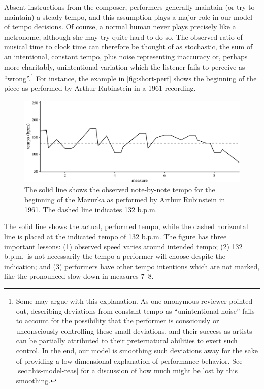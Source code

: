 \documentclass[aoas]{imsart}
\begin{document}
Absent instructions from the composer, performers generally maintain
(or try to maintain) a steady tempo, and this assumption plays a major
role in our model of tempo decisions. Of course, a normal human 
never plays precisely like a 
metronome, although she may try quite hard to do so. The observed
ratio of musical time to clock time
can therefore be thought of as stochastic, the sum of an
intentional, constant tempo, plus noise representing inaccuracy
or, perhaps more charitably, unintentional variation which the
listener fails to perceive as ``wrong''.\footnote{Some may argue with
  this explanation. As one anonymous reviewer pointed out, describing
  deviations from constant tempo as ``unintentional noise'' fails to
  account for the possibility that the performer is consciously or
  unconsciously controlling these small deviations, and their success
  as artists can be partially attributed to their preternatural
  abilities to exert such control. In the end, our
  model is smoothing such deviations away for the sake of providing a
  low-dimensional explanation of performance behavior. See
  \autoref{sec:this-model-reas} for a discussion of how much might be
  lost by this smoothing.} For instance, the example in
\autoref{fig:short-perf} shows the beginning of the piece as performed
by Arthur Rubinstein in a 1961 recording. 
\begin{figure}[t!]
 \centering
 \includegraphics[width=.9\linewidth]{small-rubinstein-1961-1}
 \caption{The solid line shows the observed note-by-note tempo for
   the beginning of the Mazurka as performed by Arthur Rubinstein in
   1961. The dashed line indicates 132 b.p.m.}
 \label{fig:short-perf}
\end{figure}
The solid line shows the
actual, performed tempo, while the dashed horizontal line is placed at
the indicated tempo of 132 b.p.m. The figure has three important
lessons: (1) observed speed varies around intended tempo; (2) 132 b.p.m.\ is
not necessarily the tempo a performer will choose despite the
indication; and (3) performers have other tempo intentions which are
not marked, like the pronounced slow-down in measures 7--8.
\end{document}
